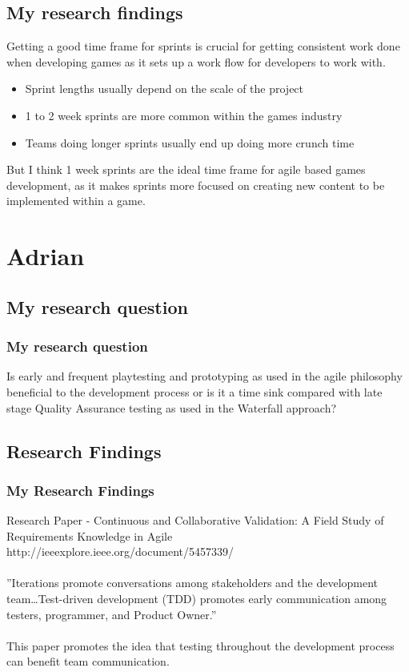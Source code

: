 \documentclass{beamer}
\begin{document}
\subsection{My research findings}
\begin{frame}
Getting a good time frame for sprints is crucial for getting consistent work done when developing games as it sets up a work flow for developers to work with.\\
\begin{itemize}
\frametitle{My research findings}
\item Sprint lengths usually depend on the scale of the project
\item 1 to 2 week sprints are more common within the games industry
\item Teams doing longer sprints usually end up doing more crunch time
\end{itemize}
But I think 1 week sprints are the ideal time frame for agile based games development, as it makes sprints more focused on creating new content to be implemented within a game.
\end{frame}

\section{Adrian}
\subsection{My research question}
\begin{frame}
\frametitle{My research question}
Is early and frequent playtesting and prototyping as used in the agile philosophy beneficial to the development process or is it a time sink compared with late stage Quality Assurance testing as used in the Waterfall approach?
\end{frame}

\subsection{Research Findings}
\begin{frame}
\frametitle{My Research Findings}
Research Paper - Continuous and Collaborative Validation: A Field Study of Requirements Knowledge in Agile 
\\http://ieeexplore.ieee.org/document/5457339/\\~\\

''Iterations promote conversations among stakeholders and the development team…Test-driven development (TDD) promotes early communication among testers, programmer, and Product Owner.''
\\~\\

This paper promotes the idea that testing throughout the development process can benefit team communication.
\end{frame}
\end{document}
